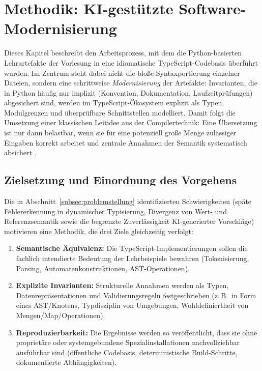 
\section{Methodik: KI-gestützte Software-Modernisierung}
\label{sec:hauptteil}

Dieses Kapitel beschreibt den Arbeitsprozess, mit dem die Python-basierten Lehrartefakte der Vorlesung in eine idiomatische TypeScript-Codebasis überführt wurden. Im Zentrum steht dabei nicht die bloße Syntaxportierung einzelner Dateien, sondern eine schrittweise \emph{Modernisierung} der Artefakte: Invarianten, die in Python häufig nur implizit (Konvention, Dokumentation, Laufzeitprüfungen) abgesichert sind, werden im TypeScript-Ökosystem explizit als Typen, Modulgrenzen und überprüfbare Schnittstellen modelliert. Damit folgt die Umsetzung einer klassischen Leitidee aus der Compilertechnik: Eine Übersetzung ist nur dann belastbar, wenn sie für eine potenziell große Menge zulässiger Eingaben korrekt arbeitet und zentrale Annahmen der Semantik systematisch absichert \autocite[S.~14]{aho2006compilers}.

\subsection{Zielsetzung und Einordnung des Vorgehens}
\label{subsec:methodik_ziel}

Die in Abschnitt~\ref{subsec:problemstellung} identifizierten Schwierigkeiten (späte Fehlererkennung in dynamischer Typisierung, Divergenz von Wert- und Referenzsemantik sowie die begrenzte Zuverlässigkeit KI-generierter Vorschläge) motivieren eine Methodik, die drei Ziele gleichzeitig verfolgt:
\begin{enumerate}
    \item \textbf{Semantische Äquivalenz:} Die TypeScript-Implementierungen sollen die fachlich intendierte Bedeutung der Lehrbeispiele bewahren (Tokenisierung, Parsing, Automatenkonstruktionen, AST-Operationen).
   \item \textbf{Explizite Invarianten:} Strukturelle Annahmen werden als Typen,
Daten\-repräsentationen und Validierungs\-regeln festgeschrieben (z.\,B.\ in Form eines
AST\-/Knotens, Typdisziplin von Umgebungen, Wohl\-definiert\-heit von
Mengen\-/Map\-/Operationen).
    \item \textbf{Reproduzierbarkeit:} Die Ergebnisse werden so veröffentlicht, dass sie ohne proprietäre oder systemgebundene Spezialinstallationen nachvollziehbar ausführbar sind (öffentliche Codebasis, deterministische Build-Schritte, dokumentierte Abhängigkeiten).
\end{enumerate}

